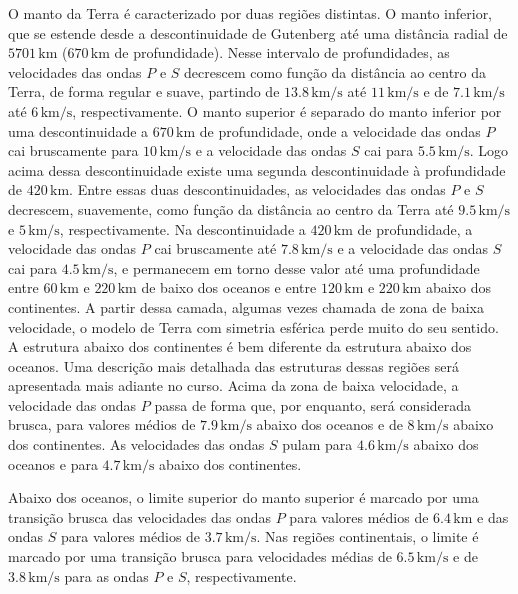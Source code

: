 \documentclass[]{book}
\theoremstyle{definition}
\theoremstyle{definition}
\theoremstyle{definition}
\theoremstyle{remark}
\begin{document}
O manto da Terra é caracterizado por duas regiões distintas. O manto inferior, que se estende desde a descontinuidade de Gutenberg até uma distância radial de \(5701\,\mathrm{km}\) (\(670\,\mathrm{km}\) de profundidade). Nesse intervalo de profundidades, as velocidades das ondas \(P\) e \(S\) decrescem como função da distância ao centro da Terra, de forma regular e suave, partindo de \(13.8\,\mathrm{km/s}\) até \(11\,\mathrm{km/s}\) e de \(7.1\,\mathrm{km/s}\) até \(6\,\mathrm{km/s}\), respectivamente. O manto superior é separado do manto inferior por uma descontinuidade a \(670\,\mathrm{km}\) de profundidade, onde a velocidade das ondas \(P\) cai bruscamente para \(10\,\mathrm{km/s}\) e a velocidade das ondas \(S\) cai para \(5.5\,\mathrm{km/s}\). Logo acima dessa descontinuidade existe uma segunda descontinuidade à profundidade de \(420\,\mathrm{km}\). Entre essas duas descontinuidades, as velocidades das ondas \(P\) e \(S\) decrescem, suavemente, como função da distância ao centro da Terra até \(9.5\,\mathrm{km/s}\) e \(5\,\mathrm{km/s}\), respectivamente. Na descontinuidade a \(420\, \mathrm{km}\) de profundidade, a velocidade das ondas \(P\) cai bruscamente até \(7.8\,\mathrm{km/s}\) e a velocidade das ondas \(S\) cai para \(4.5\,\mathrm{km/s}\), e permanecem em torno desse valor até uma profundidade entre \(60\,\mathrm{km}\) e \(220\,\mathrm{km}\) de baixo dos oceanos e entre \(120\,\mathrm{km}\) e \(220\,\mathrm{km}\) abaixo dos continentes. A partir dessa camada, algumas vezes chamada de zona de baixa velocidade, o modelo de Terra com simetria esférica perde muito do seu sentido. A estrutura abaixo dos continentes é bem diferente da estrutura abaixo dos oceanos. Uma descrição mais detalhada das estruturas dessas regiões será apresentada mais adiante no curso. Acima da zona de baixa velocidade, a velocidade das ondas \(P\) passa de forma que, por enquanto, será considerada brusca, para valores médios de \(7.9\,\mathrm{km/s}\) abaixo dos oceanos e de \(8\,\mathrm{km/s}\) abaixo dos continentes. As velocidades das ondas \(S\) pulam para \(4.6\,\mathrm{km/s}\) abaixo dos oceanos e para \(4.7\,\mathrm{km/s}\) abaixo dos continentes.

Abaixo dos oceanos, o limite superior do manto superior é marcado por uma transição brusca das velocidades das ondas \(P\) para valores médios de \(6.4\,\mathrm{km}\) e das ondas \(S\) para valores médios de \(3.7\,\mathrm{km/s}\). Nas regiões continentais, o limite é marcado por uma transição brusca para velocidades médias de \(6.5\,\mathrm{km/s}\) e de \(3.8\,\mathrm{km/s}\) para as ondas \(P\) e \(S\), respectivamente.
\end{document}
